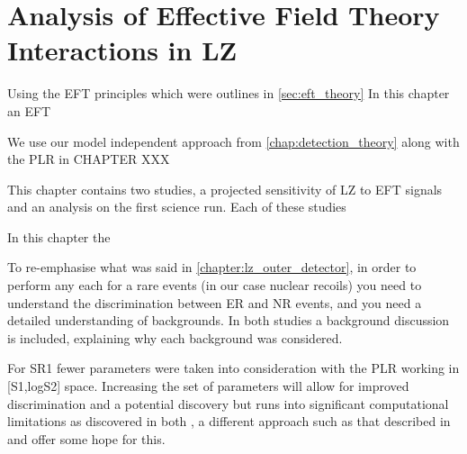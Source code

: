 \chapter{Analysis of Effective Field Theory Interactions in LZ}
\label{chap:eft_work}
Using the EFT principles which were outlines in \autoref{sec:eft_theory} In this chapter an EFT

We use our model independent approach from \autoref{chap:detection_theory} along with the PLR in CHAPTER XXX



\par
This chapter contains two studies, a projected sensitivity of LZ to EFT signals and an analysis on the first science run.
Each of these studies 

\par
In this chapter the 

\par
To re-emphasise what was said in \autoref{chapter:lz_outer_detector}, in order to perform any each for a rare events (in our case nuclear recoils) you need to understand the discrimination between ER and NR events, and you need a detailed understanding of backgrounds.
In both studies a background discussion is included, explaining why each background was considered.


%

%

%



%

%

For SR1 fewer parameters were taken into consideration with the PLR working in [S1,logS2] space.
Increasing the set of parameters will allow for improved discrimination and a potential discovery but runs into significant computational limitations as discovered in both \cite{nicolelarsen_thesis_ref, shaunalsum_thesis_ref, billyboxer_thesis_ref}, a different approach such as that described in \cite{flamenest_ref} and \cite{lux_ml_plr_ref} offer some hope for this.